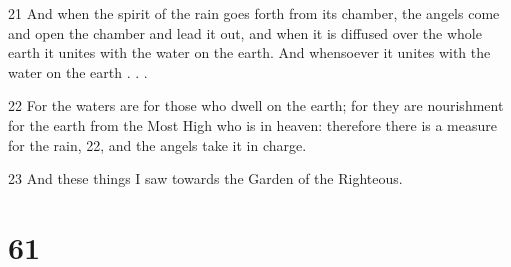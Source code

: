 \par 21 And when the spirit of the rain goes forth from its chamber, the angels come and open the chamber and lead it out, and when it is diffused over the whole earth it unites with the water on the earth. And whensoever it unites with the water on the earth . . .
\par 22 For the waters are for those who dwell on the earth; for they are nourishment for the earth from the Most High who is in heaven: therefore there is a measure for the rain, 22, and the angels take it in charge. 
\par 23 And these things I saw towards the Garden of the Righteous.

\chapter{61}

